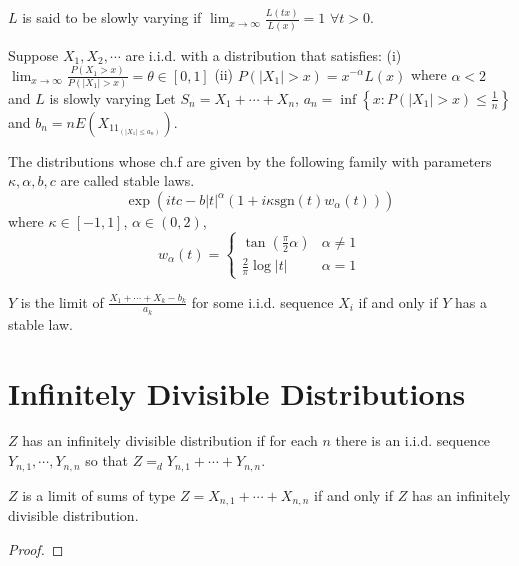 \begin{definition}
    $L$ is said to be slowly varying if $\lim_{x\to\infty}\frac{L(tx)}{L(x)}=1$ $\forall t>0$.
\end{definition}

\begin{theorem}
    Suppose $X_1,X_2,\cdots$ are i.i.d. with a distribution that satisfies:\newline 
    (i) $\lim_{x\to\infty}\frac{P(X_1>x)}{P(\left|X_1\right|>x)}=\theta\in [0,1]$\newline 
    (ii) $P(\left|X_1\right|>x)=x^{-\alpha}L(x)$ where $\alpha<2$ and $L$ is slowly varying\newline 
    Let $S_n=X_1+\cdots+X_n$, $a_n=\inf\left\{x:P(\left|X_1\right|>x)\le \frac{1}{n}\right\}$ and $b_n=nE(X_11_{(\left|X_1\right|\le a_n)})$.
\end{theorem}

\begin{definition}
    The distributions whose ch.f are given by the following family with parameters $\kappa,\alpha,b,c$ are called stable laws.
    \[\exp{(itc-b\left|t\right|^\alpha(1+i\kappa\text{sgn}(t)w_\alpha(t)))}\] 
    where $\kappa\in [-1,1]$, $\alpha\in (0,2)$,
    \[w_\alpha(t) =\left\{\begin{matrix}
        \tan(\frac{\pi}{2}\alpha )  & \alpha \ne 1\\
         \frac{2}{\pi}\log\left|t\right| &\alpha =1
       \end{matrix}\right.\]
\end{definition}

\begin{theorem}
    $Y$ is the limit of $\frac{X_1+\cdots+X_k-b_k}{a_k}$ for some i.i.d. sequence $X_i$ if and only if $Y$ has a stable law.
\end{theorem}

\section{Infinitely Divisible Distributions}
\begin{definition}
    $Z$ has an infinitely divisible distribution if for each $n$ there is an i.i.d. sequence $Y_{n,1},\cdots,Y_{n,n}$ so that $Z=_d Y_{n,1}+\cdots+Y_{n,n}$.
\end{definition}
\begin{theorem}
    $Z$ is a limit of sums of type $Z=X_{n,1}+\cdots+X_{n,n}$ if and only if $Z$ has an infinitely divisible distribution.
\end{theorem}
\begin{proof}
    
\end{proof}

